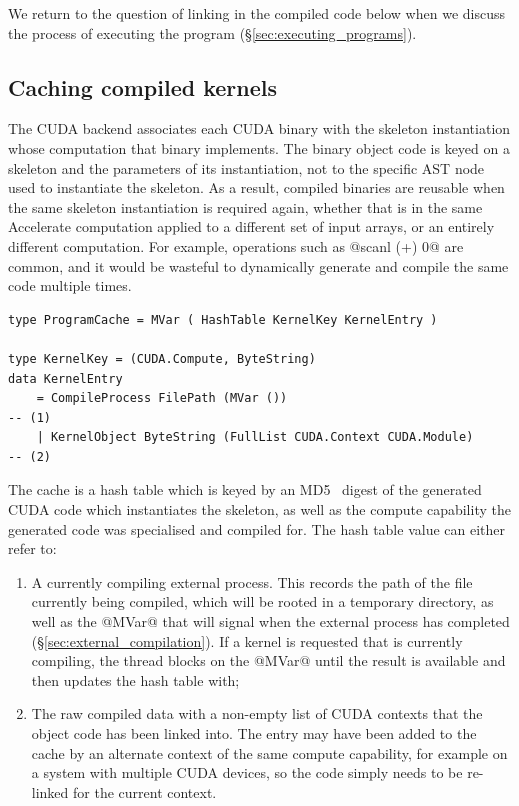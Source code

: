 We return to the question of linking in the compiled code below when we discuss
the process of executing the program (\S\ref{sec:executing_programs}).


\subsection{Caching compiled kernels}
\label{sec:caching_compiled_kernels}

The CUDA backend associates each CUDA binary with the skeleton instantiation
whose computation that binary implements. The binary object code is keyed on a
skeleton and the parameters of its instantiation, not to the specific AST node
used to instantiate the skeleton. As a result, compiled binaries are reusable
when the same skeleton instantiation is required again, whether that is in the
same Accelerate computation applied to a different set of input arrays, or an
entirely different computation. For example, operations such as @scanl (+) 0@
are common, and it would be wasteful to dynamically generate and compile the
same code multiple times.

\begin{lstlisting}[style=haskell,numbers=none]
type ProgramCache = MVar ( HashTable KernelKey KernelEntry )

type KernelKey = (CUDA.Compute, ByteString)
data KernelEntry
    = CompileProcess FilePath (MVar ())                                            -- (1)
    | KernelObject ByteString (FullList CUDA.Context CUDA.Module)                  -- (2)
\end{lstlisting}

The cache is a hash table which is keyed by an MD5~\cite{Rivest:1992va} digest
of the generated CUDA code which instantiates the skeleton, as well as the
compute capability the generated code was specialised and compiled for. The hash
table value can either refer to:
%
\begin{enumerate}
\item A currently compiling external process. This records the path of the file
    currently being compiled, which will be rooted in a temporary directory, as
    well as the @MVar@ that will signal when the external process has
    completed (\S\ref{sec:external_compilation}). If a kernel is requested that
    is currently compiling, the thread blocks on the @MVar@ until the
    result is available and then updates the hash table with;

\item The raw compiled data with a non-empty list of CUDA contexts that the
    object code has been linked into. The entry may have been added to the cache
    by an alternate context of the same compute capability, for example on a
    system with multiple CUDA devices, so the code simply needs to be
    re-linked for the current context.
\end{enumerate}

